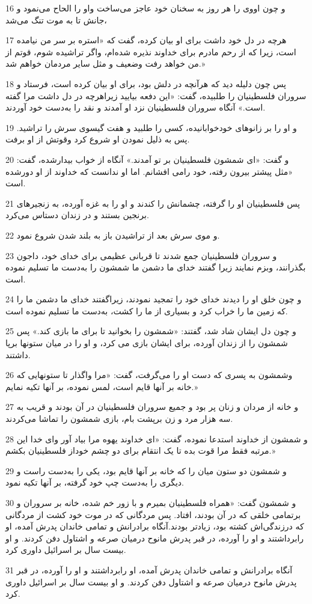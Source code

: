 \par 16 و چون اووی را هر روز به سخنان خود عاجز می‌ساخت واو را الحاح می‌نمود و جانش تا به موت تنگ می‌شد،
\par 17 هر‌چه در دل خود داشت برای او بیان کرده، گفت که «استره بر سر من نیامده است، زیرا که از رحم مادرم برای خداوند نذیره شده‌ام، واگر تراشیده شوم، قوتم از من خواهد رفت وضعیف و مثل سایر مردمان خواهم شد.»
\par 18 پس چون دلیله دید که هرآنچه در دلش بود، برای او بیان کرده است، فرستاد و سروران فلسطینیان را طلبیده، گفت: «این دفعه بیایید زیراهرچه در دل داشت مرا گفته است.» آنگاه سروران فلسطینیان نزد او آمدند و نقد را به‌دست خود آوردند.
\par 19 و او را بر زانوهای خودخوابانیده، کسی را طلبید و هفت گیسوی سرش را تراشید. پس به ذلیل نمودن او شروع کرد وقوتش از او برفت.
\par 20 و گفت: «ای شمشون فلسطینیان بر تو آمدند.» آنگاه از خواب بیدارشده، گفت: «مثل پیشتر بیرون رفته، خود رامی افشانم. اما او ندانست که خداوند از او دورشده است.
\par 21 پس فلسطینیان او را گرفته، چشمانش را کندند و او را به غزه آورده، به زنجیرهای برنجین بستند و در زندان دستاس می‌کرد.
\par 22 و موی سرش بعد از تراشیدن باز به بلند شدن شروع نمود. 
\par 23 و سروران فلسطینیان جمع شدند تا قربانی عظیمی برای خدای خود، داجون بگذرانند، وبزم نمایند زیرا گفتند خدای ما دشمن ما شمشون را به‌دست ما تسلیم نموده است.
\par 24 و چون خلق او را دیدند خدای خود را تمجید نمودند، زیراگفتند خدای ما دشمن ما را که زمین ما را خراب کرد و بسیاری از ما را کشت، به‌دست ما تسلیم نموده است.
\par 25 و چون دل ایشان شاد شد، گفتند: «شمشون را بخوانید تا برای ما بازی کند.» پس شمشون را از زندان آورده، برای ایشان بازی می کرد، و او را در میان ستونها برپا داشتند.
\par 26 وشمشون به پسری که دست او را می‌گرفت، گفت: «مرا واگذار تا ستونهایی که خانه بر آنها قایم است، لمس نموده، بر آنها تکیه نمایم.»
\par 27 و خانه از مردان و زنان پر بود و جمیع سروران فلسطینیان در آن بودند و قریب به سه هزار مرد و زن برپشت بام، بازی شمشون را تماشا می‌کردند.
\par 28 و شمشون از خداوند استدعا نموده، گفت: «ای خداوند یهوه مرا بیاد آور و‌ای خدا این مرتبه فقط مرا قوت بده تا یک انتقام برای دو چشم خوداز فلسطینیان بکشم.»
\par 29 و شمشون دو ستون میان را که خانه بر آنها قایم بود، یکی را به‌دست راست و دیگری را به‌دست چپ خود گرفته، بر آنها تکیه نمود.
\par 30 و شمشون گفت: «همراه فلسطینیان بمیرم و با زور خم شده، خانه بر سروران و برتمامی خلقی که در آن بودند، افتاد. پس مردگانی که در موت خود کشت از مردگانی که درزندگی‌اش کشته بود، زیادتر بودند.آنگاه برادرانش و تمامی خاندان پدرش آمده، او رابرداشتند و او را آورده، در قبر پدرش مانوح درمیان صرعه و اشتاول دفن کردند. و او بیست سال بر اسرائیل داوری کرد.
\par 31 آنگاه برادرانش و تمامی خاندان پدرش آمده، او رابرداشتند و او را آورده، در قبر پدرش مانوح درمیان صرعه و اشتاول دفن کردند. و او بیست سال بر اسرائیل داوری کرد.
 
